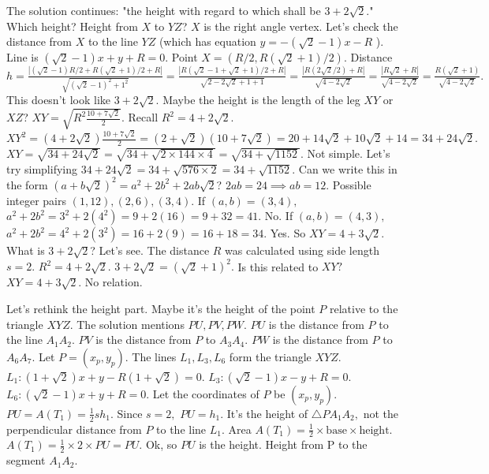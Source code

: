 The solution continues: "the height with regard to which shall be $3+2\sqrt{2}$." Which height? Height from $X$ to $YZ$? $X$ is the right angle vertex. Let's check the distance from $X$ to the line $YZ$ (which has equation $y = -(\sqrt{2}-1)x - R$ ). Line is $(\sqrt{2}-1)x + y + R = 0.$ 
Point $X=(R/2, R(\sqrt{2}+1)/2).$ 
Distance $h = \frac{|(\sqrt{2}-1)R/2 + R(\sqrt{2}+1)/2 + R|}{\sqrt{(\sqrt{2}-1)^2 + 1^2}} = \frac{|R(\sqrt{2}-1 + \sqrt{2}+1)/2 + R|}{\sqrt{2-2\sqrt{2}+1 + 1}} = \frac{|R(2\sqrt{2}/2) + R|}{\sqrt{4-2\sqrt{2}}} = \frac{|R\sqrt{2} + R|}{\sqrt{4-2\sqrt{2}}} = \frac{R(\sqrt{2}+1)}{\sqrt{4-2\sqrt{2}}}.$ 
This doesn't look like $3+2\sqrt{2}.$ Maybe the height is the length of the leg $XY$ or $XZ$? 
$XY = \sqrt{R^2 \frac{10+7\sqrt{2}}{2}}.$ Recall $R^2 = 4+2\sqrt{2}.$ 
$XY^2 = (4+2\sqrt{2}) \frac{10+7\sqrt{2}}{2} = (2+\sqrt{2})(10+7\sqrt{2}) = 20 + 14\sqrt{2} + 10\sqrt{2} + 14 = 34 + 24\sqrt{2}.$ 
$XY = \sqrt{34+24\sqrt{2}} = \sqrt{34+ \sqrt{2 \times 144 \times 4}} = \sqrt{34+\sqrt{1152}}.$ Not simple. 
Let's try simplifying $34+24\sqrt{2} = 34+\sqrt{576 \times 2} = 34+\sqrt{1152}.$ Can we write this in the form $(a+b\sqrt{2})^2 = a^2+2b^2 + 2ab\sqrt{2}$? 
$2ab = 24 \implies ab=12.$ Possible integer pairs $(1,12), (2,6), (3,4).$ 
If $(a,b)=(3,4),$ $a^2+2b^2 = 3^2 + 2(4^2) = 9 + 2(16) = 9+32=41.$ No. 
If $(a,b)=(4,3),$ $a^2+2b^2 = 4^2 + 2(3^2) = 16 + 2(9) = 16+18=34.$ Yes. 
So $XY = 4+3\sqrt{2}.$ 
What is $3+2\sqrt{2}$? Let's see. The distance $R$ was calculated using side length $s=2.$ $R^2 = 4+2\sqrt{2}.$ 
$3+2\sqrt{2} = (\sqrt{2}+1)^2.$ Is this related to $XY?$ $XY=4+3\sqrt{2}.$ No relation.

Let's rethink the height part. Maybe it's the height of the point $P$ relative to the triangle $XYZ.$ 
The solution mentions $PU, PV, PW.$ $PU$ is the distance from $P$ to the line $A_1A_2.$ $PV$ is the distance from $P$ to $A_3A_4.$ $PW$ is the distance from $P$ to $A_6A_7.$ 
Let $P=(x_p, y_p).$ The lines $L_1, L_3, L_6$ form the triangle $XYZ.$ 
$L_1: (1+\sqrt{2})x + y - R(1+\sqrt{2}) = 0.$ 
$L_3: (\sqrt{2}-1)x - y + R = 0.$ 
$L_6: (\sqrt{2}-1)x + y + R = 0.$ 
Let the coordinates of $P$ be $(x_p, y_p).$ 
$PU = A(T_1) = \frac{1}{2} s h_1.$ Since $s=2,$ $PU=h_1.$ It's the height of $\triangle PA_1A_2,$ not the perpendicular distance from $P$ to the line $L_1.$ Area $A(T_1) = \frac{1}{2} \times \text{base} \times \text{height}.$ $A(T_1) = \frac{1}{2} \times 2 \times PU = PU.$ Ok, so $PU$ is the height. Height from P to the segment $A_1A_2.$

